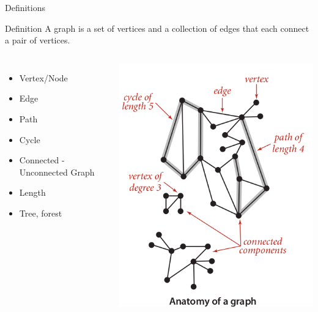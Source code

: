 \documentclass{beamer}
\begin{document}
\begin{frame}{Definitions}


\begin{block}{Definition}
A graph is a set of vertices and a collection of edges that each connect a pair of vertices.
\end{block}


\begin{columns}[c]
\column{1.7in}
\begin{itemize}
  \item Vertex/Node
  \item Edge
  \item Path
  \item Cycle
  \item Connected - Unconnected Graph
  \item Length
  \item Tree, forest
\end{itemize}
\column{1.7in}
\includegraphics[width=1\textwidth]{Selection_024.png}
\end{columns}
\end{frame}
\end{document}
